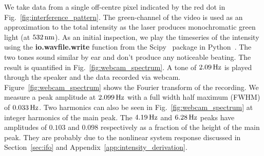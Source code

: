 \documentclass[paper-main.tex]{subfiles}
\begin{document}
We take data from a single off-centre pixel indicated by the red dot in Fig.~\ref{fig:interference_pattern}. 
The green-channel of the video is used as an approximation to the total intensity as the laser produces monochromatic green light (at $532\,{\rm nm}$).
As an initial inspection, we play the timeseries of the intensity using the \textbf{io.wavfile.write} function from the Scipy~\cite{scipy} package in Python~\cite{python}. 
The two tones sound similar by ear and don't produce any noticeable beating. 
The result is quantified in Fig.~\ref{fig:webcam_spectrum}. 
A tone of $2.09\,{\rm Hz}$ is played through the speaker and the data recorded via webcam. 
Figure~\ref{fig:webcam_spectrum} shows the Fourier transform of the recording.
We measure a peak amplitude at $2.099\,{\rm Hz}$ with a full width half maximum (FWHM) of $0.033\,{\rm Hz}$. 
Two harmonics can also be seen in Fig.~\ref{fig:webcam_spectrum} at integer harmonics of the main peak. 
The $4.19\,{\rm Hz}$ and $6.28\,{\rm Hz}$ peaks have amplitudes of $0.103$ and $0.098$ respectively as a fraction of the height of the main peak. 
They are probably due to the nonlinear system response discussed in Section~\ref{sec:ifo} and Appendix~\ref{app:intensity_derivation}. 



\end{document}
